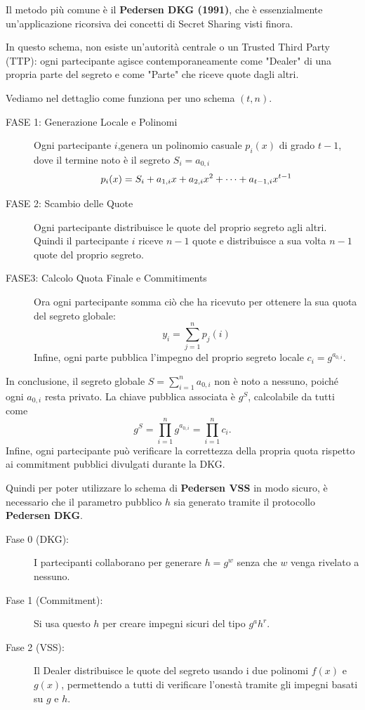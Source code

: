 \documentclass[a4paper, 11pt]{article}
\begin{document}
Il metodo più comune è il \textbf{Pedersen DKG (1991)}, che è essenzialmente un'applicazione ricorsiva dei concetti di Secret Sharing visti finora.

In questo schema, non esiste un'autorità centrale o un Trusted Third Party (TTP): ogni partecipante agisce contemporaneamente come "Dealer" di una propria parte del segreto e come "Parte" che riceve quote dagli altri.

Vediamo nel dettaglio come funziona per uno schema $(t, n)$.

\begin{description}
    \item[FASE 1: Generazione Locale e Polinomi] Ogni partecipante $i$,genera un polinomio casuale $p_i(x)$ di grado $t-1$, dove il termine noto è il segreto $S_i = a_{0,i}$
    \[
        p_i(x) = S_i + a_{1,i}x + a_{2,i}x^2 + \dots + a_{t-1,i}x^{t-1}\\ 
    \]
    \item[FASE 2: Scambio delle Quote] Ogni partecipante distribuisce le quote del proprio segreto agli altri. Quindi il partecipante $i$ riceve $n-1$ quote e distribuisce a sua volta $n-1$ quote del proprio segreto.
    \item[FASE3: Calcolo Quota Finale e Commitiments] Ora ogni partecipante somma ciò che ha ricevuto per ottenere la sua quota del segreto globale:
    \[
    y_i = \sum_{j = 1}^{n}p_j(i)
    \]
    Infine, ogni parte pubblica l'impegno del proprio segreto locale $c_i = g^{a_{0,i}}$.
\end{description}

In conclusione, il segreto globale $S=\sum_{i=1}^{n} a_{0,i}$ non è noto a nessuno, poiché ogni $a_{0,i}$ resta privato. La chiave pubblica associata è $g^{S}$, calcolabile da tutti come
\[
g^{S}=\prod_{i=1}^{n} g^{a_{0,i}}=\prod_{i=1}^{n} c_i.
\]
Infine, ogni partecipante può verificare la correttezza della propria quota rispetto ai commitment pubblici divulgati durante la DKG.

\newpage

Quindi per poter utilizzare lo schema di \textbf{Pedersen VSS} in modo sicuro, è necessario che il parametro pubblico $h$ sia generato tramite il protocollo \textbf{Pedersen DKG}.

\begin{description}
    \item[Fase 0 (DKG):] I partecipanti collaborano per generare $h=g^w$ senza che $w$ venga rivelato a nessuno.
    \item[Fase 1 (Commitment):] Si usa questo $h$ per creare impegni sicuri del tipo $g^ah^r$.
    \item[Fase 2 (VSS):] Il Dealer distribuisce le quote del segreto usando i due polinomi $f(x)$ e $g(x)$, permettendo a tutti di verificare l'onestà tramite gli impegni basati su $g$ e $h$.
\end{description}
\end{document}

